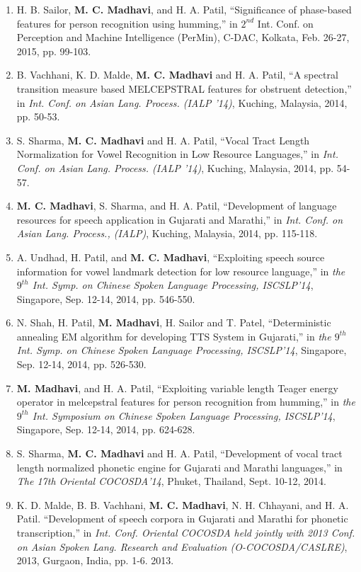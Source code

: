 \documentclass[10pt]{article}
\begin{document}
\begin{enumerate}[resume]
\item H. B. Sailor, \textbf{M. C. Madhavi}, and H. A. Patil, ``Significance of phase-based features for person recognition using humming,'' in $2^{nd}$ Int. Conf. on Perception and Machine Intelligence (PerMin), C-DAC, Kolkata, Feb. 26-27, 2015, pp. 99-103. 

\item B. Vachhani, K. D. Malde, \textbf{M. C. Madhavi} and H. A. Patil, ``A spectral transition measure based MELCEPSTRAL features for obstruent detection,'' in \textit{Int. Conf. on Asian Lang. Process. (IALP '14)}, Kuching, Malaysia, 2014, pp. 50-53.
\item S. Sharma, \textbf{M. C. Madhavi} and H. A. Patil, ``Vocal Tract Length Normalization for Vowel Recognition in Low Resource Languages,'' in \textit{Int. Conf. on Asian Lang. Process. (IALP '14)}, Kuching, Malaysia, 2014, pp. 54-57.
\item \textbf{M. C. Madhavi}, S. Sharma, and H. A. Patil, ``Development of language resources for speech application in Gujarati and Marathi,''
in \textit{Int. Conf. on Asian Lang. Process., (IALP)}, Kuching, Malaysia, 2014, pp. 115-118.
\item 	A. Undhad, H. Patil, and \textbf{M. C. Madhavi}, ``Exploiting speech source information for vowel landmark detection for low resource language,'' in \textit{the $ 9^{th} $  Int. Symp. on Chinese Spoken Language Processing, ISCSLP'14},  Singapore, Sep. 12-14, 2014, pp. 546-550.
\item 	N. Shah, H. Patil, \textbf{M. Madhavi}, H. Sailor and T. Patel, ``Deterministic annealing EM algorithm for developing TTS System in Gujarati,'' in \textit{the $ 9^{th} $  Int. Symp. on Chinese Spoken Language Processing, ISCSLP'14},  Singapore, Sep. 12-14, 2014, pp. 526-530.
\item 	\textbf{M. Madhavi}, and H. A. Patil, ``Exploiting variable length Teager energy operator in melcepstral features for person recognition from humming,'' in \textit{the $ 9^{th} $  Int. Symposium on Chinese Spoken Language Processing, ISCSLP'14},  Singapore, Sep. 12-14, 2014, pp. 624-628.
\item 	S. Sharma, \textbf{M. C. Madhavi} and H. A. Patil, ``Development of vocal tract length normalized phonetic engine for Gujarati and Marathi languages,''  in \textit{The 17th Oriental COCOSDA'14}, Phuket, Thailand, Sept. 10-12, 2014.
\item K. D. Malde, B. B. Vachhani,\textbf{ M. C. Madhavi}, N. H. Chhayani, and H. A. Patil. ``Development of speech corpora in Gujarati and Marathi for phonetic transcription,'' in \textit{Int. Conf. Oriental COCOSDA held jointly with 2013 Conf. on Asian Spoken Lang. Research and Evaluation (O-COCOSDA/CASLRE)}, 2013, Gurgaon, India, pp. 1-6. 2013.

\end{enumerate}
\end{document}
